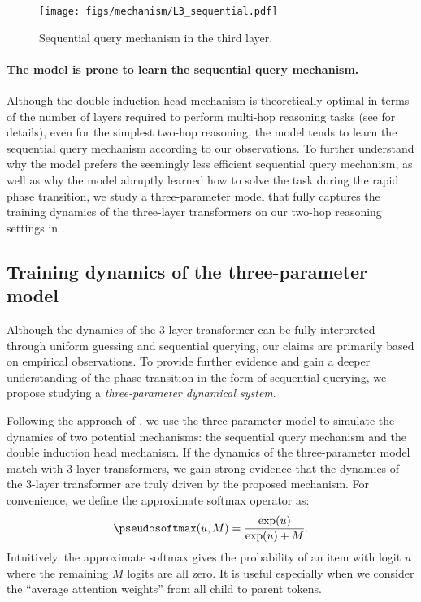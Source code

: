 \begin{figure}[h]
    \centering
    \texttt{[image: figs/mechanism/L3\_sequential.pdf]}
    \caption{Sequential query mechanism in the third layer.}
    \label{fig:mech:L3_sequential}
\end{figure}

\paragraph{The model is prone to learn the sequential query mechanism.} Although the double induction head mechanism is theoretically optimal in terms of the number of layers required to perform multi-hop reasoning tasks (see  for details), even for the simplest two-hop reasoning, the model tends to learn the sequential query mechanism according to our observations. To further understand why the model prefers the seemingly less efficient sequential query mechanism, as well as why the model abruptly learned how to solve the task during the rapid phase transition, we study a three-parameter model that fully captures the training dynamics of the three-layer transformers on our two-hop reasoning settings in .

\subsection{Training dynamics of the three-parameter model}
\label{sec:three_param_model}
Although the dynamics of the 3-layer transformer can be fully interpreted through uniform guessing and sequential querying, our claims are primarily based on empirical observations. To provide further evidence and gain a deeper understanding of the phase transition in the form of sequential querying, we propose studying a \textit{three-parameter dynamical system}.

Following the approach of \citet{reddy2023mechanistic}, we use the three-parameter model to simulate the dynamics of two potential mechanisms: the sequential query mechanism and the double induction head mechanism. If the dynamics of the three-parameter model match with 3-layer transformers, we gain strong evidence that the dynamics of the 3-layer transformer are truly driven by the proposed mechanism. For convenience, we define the approximate softmax operator as:
\[
\pseudosoftmax(u, M) = \frac{\exp(u)}{\exp(u)+M}.
\]
Intuitively, the approximate softmax gives the probability of an item with logit $u$ where the remaining $M$ logits are all zero. It is useful especially when we consider the ``average attention weights'' from all child to parent tokens. 

